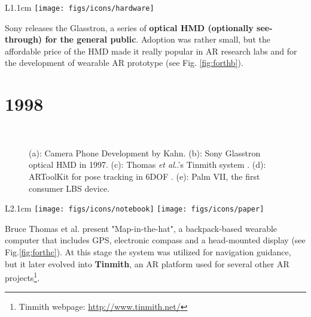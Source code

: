 \documentclass[12pt,a4paper]{article}
\makeatletter
\DeclareRobustCommand\onedot{\futurelet\@let@token\@onedot}
\def\@onedot{\ifx\@let@token.\else.\null\fi\xspace}
\def\etal{\emph{et al}\onedot}
\makeatother
\begin{document}
\begin{wrapfigure}{L}{1.1cm}
	\vspace{-17pt}	
	\texttt{[image: figs/icons/hardware]}
	\vspace{-15pt}	
\end{wrapfigure}
\noindent Sony releases the Glasstron, a series of \textbf{optical HMD (optionally see-through) for the general public}. Adoption was rather small, but the affordable price of the HMD made it really popular in AR research labs and for the development of wearable AR prototype (see Fig. \ref{fig:forthb}).

\vspace{-5pt}
\section*{1998}

\begin{figure}[tbp]
\centering
\vspace{-50pt}
 \hfill
{} \\
 \hfill
{} \hfill
{} 
\vspace{-10pt}
\caption{(a): Camera Phone Development by Kahn. (b): Sony Glasstron optical HMD in 1997. (c): Thomas \etal's Tinmith system \cite{Thomas98}. (d): ARToolKit for pose tracking in 6DOF \cite{Kato99}. (e): Palm VII, the first consumer LBS device.} \label{fig:forth}
\vspace{-10pt}
\end{figure}

\begin{wrapfigure}{L}{2.1cm}
	\vspace{-10pt}	
	\texttt{[image: figs/icons/notebook]}
	\texttt{[image: figs/icons/paper]}	
	\vspace{-20pt}		
\end{wrapfigure}
Bruce Thomas et al. present "Map-in-the-hat", a backpack-based wearable computer that includes GPS, electronic compass and a head-mounted display \cite{Thomas98} (see Fig.\ref{fig:forthc}). At this stage the system was utilized for navigation guidance, but it later evolved into \textbf{Tinmith}, an AR platform used for several other AR projects\footnote{Tinmith webpage: \url{http://www.tinmith.net/}}.
\end{document}
